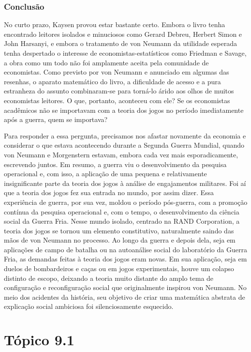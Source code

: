 \documentclass[12pt]{article}
\begin{document}
\subsubsection{\textbf{Conclusão}}
No curto prazo, Kaysen provou estar bastante certo. Embora o livro tenha encontrado leitores isolados e minuciosos como Gerard Debreu, Herbert Simon e John Harsanyi, e embora o tratamento de von Neumann da utilidade esperada tenha despertado o interesse de economistas-estatísticos como Friedman e Savage, a obra como um todo não foi amplamente aceita pela comunidade de economistas. Como previsto por von Neumann e anunciado em algumas das resenhas, o aparato matemático do livro, a dificuldade de acesso e a pura estranheza do assunto combinaram-se para torná-lo árido aos olhos de muitos economistas leitores. O que, portanto, aconteceu com ele? Se os economistas acadêmicos não se importavam com a teoria dos jogos no período imediatamente após a guerra, quem se importava?

Para responder a essa pergunta, precisamos nos afastar novamente da economia e considerar o que estava acontecendo durante a Segunda Guerra Mundial, quando von Neumann e Morgenstern estavam, embora cada vez mais esporadicamente, escrevendo juntos. Em resumo, a guerra viu o desenvolvimento da pesquisa operacional e, com isso, a aplicação de uma pequena e relativamente insignificante parte da teoria dos jogos à análise de engajamentos militares. Foi aí que a teoria dos jogos fez sua entrada no mundo, por assim dizer. Essa experiência de guerra, por sua vez, moldou o período pós-guerra, com a promoção contínua da pesquisa operacional e, com o tempo, o desenvolvimento da ciência social da Guerra Fria. Nesse mundo isolado, centrado na RAND Corporation, a teoria dos jogos se tornou um elemento constitutivo, naturalmente saindo das mãos de von Neumann no processo. Ao longo da guerra e depois dela, seja em aplicações de campo de batalha ou na autoanálise social do laboratório da Guerra Fria, as demandas feitas à teoria dos jogos eram novas. Em sua aplicação, seja em duelos de bombardeiros e caças ou em jogos experimentais, houve um colapso distinto de escopo, deixando a teoria muito distante do amplo tema de configuração e reconfiguração social que originalmente inspirou von Neumann. No meio dos acidentes da história, seu objetivo de criar uma matemática abstrata de explicação social ambiciosa foi silenciosamente esquecido.

\newpage
\section*{\textbf{Tópico 9.1}}
\end{document}
